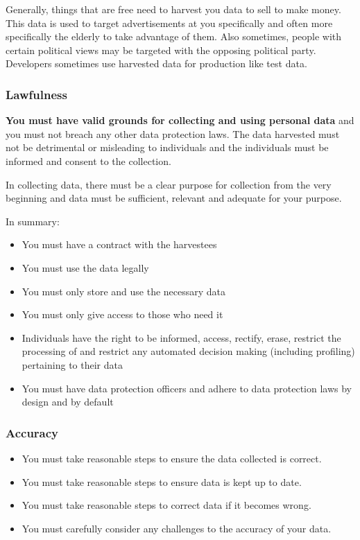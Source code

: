 Generally, things that are free need to harvest you data to sell to make money.
This data is used to target advertisements at you specifically and often more specifically the elderly to take advantage of them.
Also sometimes, people with certain political views may be targeted with the opposing political party.
Developers sometimes use harvested data for production like test data.

\subsubsection{Lawfulness}\label{ssub:lawfulness}

\textbf{You must have valid grounds for collecting and using personal data} and you must not breach any other data protection laws.
The data harvested must not be detrimental or misleading to individuals and the individuals must be informed and consent to the collection.

In collecting data, there must be a clear purpose for collection from the very beginning and data must be sufficient, relevant and adequate for your purpose.

\medskip
\noindent
In summary:

\begin{itemize}
    \item You must have a contract with the harvestees
    \item You must use the data legally
    \item You must only store and use the necessary data
    \item You must only give access to those who need it
    \item Individuals have the right to be informed, access, rectify, erase, restrict the processing of and restrict any automated decision making (including profiling) pertaining to their data
    \item You must have data protection officers and adhere to data protection laws by design and by default
\end{itemize}

\subsubsection{Accuracy}\label{ssub:acuracy}

\begin{itemize}
    \item You must take reasonable steps to ensure the data collected is correct.
    \item You must take reasonable steps to ensure data is kept up to date.
    \item You must take reasonable steps to correct data if it becomes wrong.
    \item You must carefully consider any challenges to the accuracy of your data.
\end{itemize}

